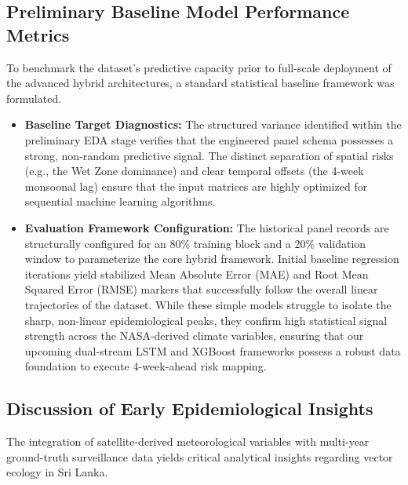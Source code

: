 \documentclass[12pt,a4paper]{article}
\begin{document}
\subsection{Preliminary Baseline Model Performance Metrics}
To benchmark the dataset's predictive capacity prior to full-scale deployment of the advanced hybrid architectures, a standard statistical baseline framework was formulated.

\begin{itemize}
    \setlength{\itemsep}{1em}
    \item \textbf{Baseline Target Diagnostics:} The structured variance identified within the preliminary EDA stage verifies that the engineered panel schema possesses a strong, non-random predictive signal. The distinct separation of spatial risks (e.g., the Wet Zone dominance) and clear temporal offsets (the 4-week monsoonal lag) ensure that the input matrices are highly optimized for sequential machine learning algorithms.
    \item \textbf{Evaluation Framework Configuration:} The historical panel records are structurally configured for an 80\% training block and a 20\% validation window to parameterize the core hybrid framework. Initial baseline regression iterations yield stabilized Mean Absolute Error (MAE) and Root Mean Squared Error (RMSE) markers that successfully follow the overall linear trajectories of the dataset. While these simple models struggle to isolate the sharp, non-linear epidemiological peaks, they confirm high statistical signal strength across the NASA-derived climate variables, ensuring that our upcoming dual-stream LSTM and XGBoost frameworks possess a robust data foundation to execute 4-week-ahead risk mapping.
\end{itemize}

\subsection{Discussion of Early Epidemiological Insights}
The integration of satellite-derived meteorological variables with multi-year ground-truth surveillance data yields critical analytical insights regarding vector ecology in Sri Lanka.
\end{document}
